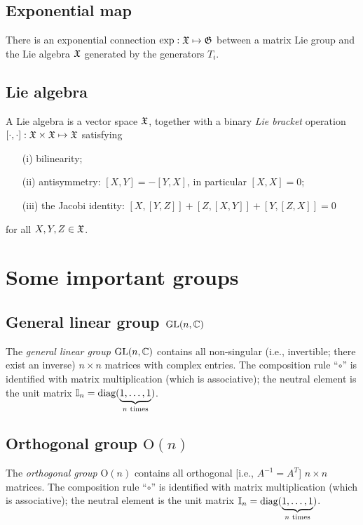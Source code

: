 \subsection{Exponential map}
There is an exponential connection
$\exp : {\frak X} \mapsto {\frak G}$
between a matrix Lie group
and the Lie algebra ${\frak X}$ generated by the generators
$ T_i $.

\subsection{Lie algebra}

A Lie algebra is a vector space ${\frak X}$,
together with a binary
{\em Lie bracket}
operation $[\cdot,\cdot ]: {\frak X} \times {\frak X}  \mapsto {\frak X} $
satisfying
\begin{itemize}
\item[(i)]
bilinearity;
\item[(ii)]
antisymmetry: $[X,Y]=-[Y,X]$, in particular $[X,X]=0$;
\item[(iii)]
the Jacobi identity:
$[X,[Y,Z]] +  [Z,[X,Y]] + [Y,[Z,X]] =0$
\end{itemize}
for all $X,Y,Z \in {\frak X}$.

\section{Some important groups}

\subsection{General linear group $\textrm{GL}(n,{\Bbb C})$}

The {\em general linear group} $\textrm{GL}(n,{\Bbb C})$
contains all  non-singular (i.e., invertible; there exist an inverse)
$n\times n$ matrices with complex entries.
The composition rule ``$\circ$''
is identified with matrix multiplication (which is associative); the neutral element is the unit
matrix ${\Bbb I}_n=\textrm{diag}(\underbrace{1,\ldots ,1}_{n \textrm{ times}})$.

\subsection{Orthogonal group $\textrm{O}(n)$}

The {\em orthogonal group} $\textrm{O}(n)$
 \cite{murnaghan}
contains all  orthogonal [i.e., $  A  ^{-1}=    A   ^T$]
$n\times n$ matrices.
The composition rule ``$\circ$''
is identified with matrix multiplication (which is associative); the neutral element is the unit
matrix ${\Bbb I}_n=\textrm{diag}(\underbrace{1,\ldots ,1}_{n \textrm{ times}})$.


